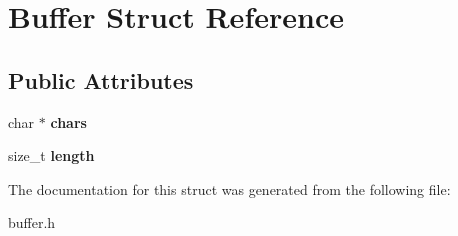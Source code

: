 \hypertarget{structBuffer}{}\section{Buffer Struct Reference}
\label{structBuffer}
\subsection*{Public Attributes}
\begin{DoxyCompactItemize}
\item 
\hypertarget{structBuffer_ab0f1e6a38969c3fa488a1c7a53427964}{}char $\ast$ {\bfseries chars}\label{structBuffer_ab0f1e6a38969c3fa488a1c7a53427964}

\item 
\hypertarget{structBuffer_ab017cc01197319698565f0eab23148ea}{}size\+\_\+t {\bfseries length}\label{structBuffer_ab017cc01197319698565f0eab23148ea}

\end{DoxyCompactItemize}


The documentation for this struct was generated from the following file\+:\begin{DoxyCompactItemize}
\item 
buffer.\+h\end{DoxyCompactItemize}
